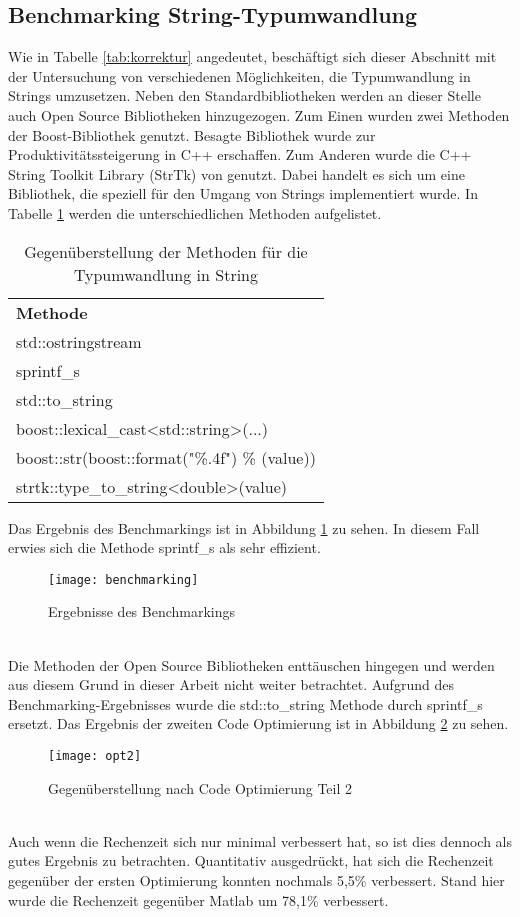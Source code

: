 \subsection{Benchmarking String-Typumwandlung}
Wie in Tabelle \ref{tab:korrektur} angedeutet, beschäftigt sich dieser Abschnitt mit der Untersuchung von verschiedenen Möglichkeiten, die Typumwandlung in Strings umzusetzen. Neben den Standardbibliotheken werden an dieser Stelle auch Open Source Bibliotheken hinzugezogen. Zum Einen wurden zwei Methoden der Boost-Bibliothek \cite{C++StandardsCommittees.2018} genutzt. Besagte Bibliothek wurde zur Produktivitätssteigerung in C++ erschaffen. Zum Anderen wurde die C++ String Toolkit Library (StrTk) von \cite{Partow.2018} genutzt. Dabei handelt es sich um eine Bibliothek, die speziell für den Umgang von Strings implementiert wurde. In Tabelle \ref{tab:benchmarking} werden die unterschiedlichen Methoden aufgelistet. 
\begin{table}[h]
	\centering\begin{tabular}{l}
		\textbf{Methode}  \\
			std::ostringstream \\
			sprintf\_s \\
			std::to\_string\\
			boost::lexical\_cast<std::string>(...)\\
			boost::str(boost::format("\%.4f") \% (value))\\
			strtk::type\_to\_string<double>(value)
			\end{tabular}
	\caption{Gegenüberstellung der Methoden für die Typumwandlung in String}
\label{tab:benchmarking}
\end{table}\newpage
Das Ergebnis des Benchmarkings ist in Abbildung \ref{fig:benchmarking} zu sehen. In diesem Fall erwies sich die Methode sprintf\_s als sehr effizient.\\
\begin{figure}[h]
	\centering
	\texttt{[image: benchmarking]}
	\caption{Ergebnisse des Benchmarkings}
	\label{fig:benchmarking}
\end{figure}\noindent\\
 Die Methoden der Open Source Bibliotheken enttäuschen hingegen und werden aus diesem Grund in dieser Arbeit nicht weiter betrachtet. Aufgrund des Benchmarking-Ergebnisses wurde die std::to\_string Methode durch sprintf\_s ersetzt. Das Ergebnis der zweiten Code Optimierung ist in Abbildung \ref{fig:opt2} zu sehen.\\
\begin{figure}[h]
	\centering
	\texttt{[image: opt2]}
	\caption{Gegenüberstellung nach Code Optimierung Teil 2}
	\label{fig:opt2}
\end{figure}\noindent\\
Auch wenn die Rechenzeit sich nur minimal verbessert hat, so ist dies dennoch als gutes Ergebnis zu betrachten. Quantitativ ausgedrückt, hat sich die Rechenzeit gegenüber der ersten Optimierung konnten nochmals 5,5\% verbessert. Stand hier wurde die Rechenzeit gegenüber Matlab um 78,1\% verbessert.

